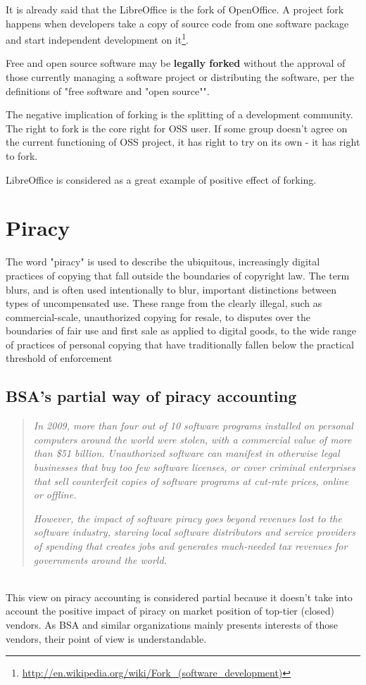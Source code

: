 \documentclass[times, utf8, seminar]{fit}
\begin{document}
It is already said that the LibreOffice is the fork of OpenOffice.  A project fork happens when developers take a copy of source code from one software package and start independent development on it\footnote{\url{http://en.wikipedia.org/wiki/Fork\_(software\_development)}}. 

Free and open source software may be \textbf{legally forked} without the approval of those currently managing a software project or distributing the software, per the definitions of "free software and "open source"".

The negative implication of forking is the splitting of a development community. The right to fork is the core right for OSS user. If some group doesn't agree on the current functioning of OSS project, it has right to try on its own - it has right to fork.

LibreOffice is considered as a great example of positive effect of forking.    

\section{Piracy}

The word "piracy" is used to describe the ubiquitous, increasingly digital practices of copying that fall outside the boundaries of copyright law. The term blurs, and is often used intentionally to blur, important distinctions between types of uncompensated use. These range from the clearly illegal, such as commercial-scale, unauthorized copying for resale, to disputes over the boundaries of fair use and first sale as applied to digital goods, to the wide range of practices of personal copying that have traditionally fallen below the practical threshold of enforcement\citep{mediapiracy}

\subsection{BSA's partial way of piracy accounting}

\begin{quotation}
\emph{In 2009, more than four out of 10 software programs installed on personal computers around the world were stolen, with a commercial value of more than \$51 billion. Unauthorized software can manifest in otherwise legal businesses that buy too few software licenses, or cover criminal enterprises that sell counterfeit copies of software programs at cut-rate prices, online or offline.}

\emph{However, the impact of software piracy goes beyond revenues lost to the software industry, starving local software distributors and service providers of spending that creates jobs and generates much-needed tax revenues for governments around the world.}\citep{bsapiracyimpact}
\end{quotation}\\
This view on piracy accounting is considered partial because it doesn't take into account the positive impact of piracy on market position of top-tier (closed) vendors. As BSA and similar organizations mainly presents interests of those vendors, their point of view is understandable.  
\end{document}
